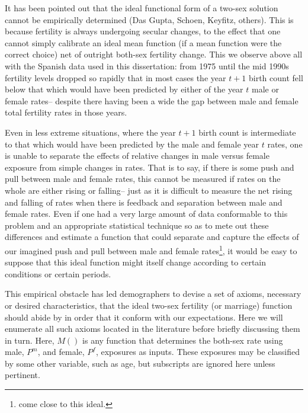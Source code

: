  \FloatBarrier
It has been pointed out that the ideal functional form of a two-sex solution
cannot be empirically determined (Das Gupta, Schoen, Keyfitz, others). This is
because fertility is always undergoing secular changes, to the effect that
one cannot simply calibrate an ideal mean function (if a mean function were the
correct choice) net of outright both-sex fertility change. This we observe above
all with the Spanish data used in this dissertation: from 1975 until the mid
1990s fertility levels dropped so rapidly that in most cases the year $t+1$
birth count fell below that which would have been predicted by either of the
year $t$ male or female rates-- despite there having been a wide the gap between
male and female total fertility rates in those years. 

Even in less
extreme situations, where the year $t+1$ birth count is intermediate to that which would
have been predicted by the male and female year $t$ rates, one is unable to
separate the effects of relative changes in male versus female exposure from
simple changes in rates. That is to say, if there is some push and pull between
male and female rates, this cannot be measured if rates on the whole are either
rising or falling-- just as it is difficult to measure the net rising and
falling of rates when there is feedback and separation between male and female
rates. Even if one had a very large amount of data conformable to this problem
and an appropriate statistical technique so as to mete out these differences 
and estimate a function that could separate and capture the effects of our
imagined push and pull between male and female
rates\footnote{\citet{alho2000competing} come close to this ideal.}, it would be easy 
to suppose that this ideal function
might itself change according to certain conditions or certain periods.

This empirical obstacle has led demographers to devise a set of axioms,
necessary or desired characteristics, that the ideal two-sex fertility
(or marriage) function should abide by in order that it conform with our
expectations. Here we will enumerate all such axioms located in the literature 
before briefly discussing them in turn. Here, $M()$ is any function that
determines the both-sex rate using male, $P^m$, and female, $P^f$, exposures as
inputs. These exposures may be classified by some other variable, such as age, but
subscripts are ignored here unless pertinent.

